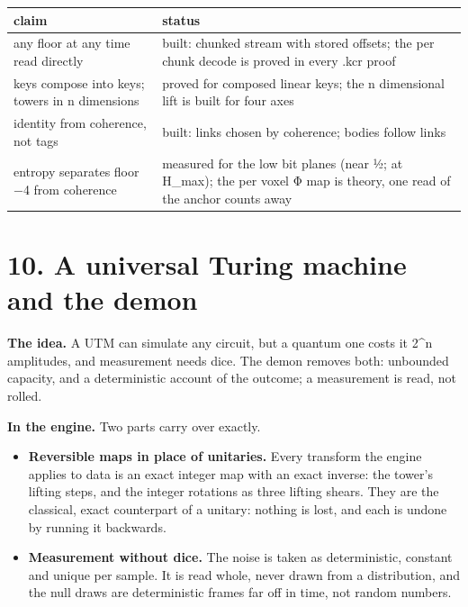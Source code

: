 {\small
\setlength{\tabcolsep}{6pt}
\begin{longtable}{>{\RaggedRight\arraybackslash}p{}>{\RaggedRight\arraybackslash}p{}}
\toprule
claim & status \\
\midrule
\endhead
any floor at any time read directly & built: chunked stream with stored offsets; the per chunk decode is proved in every .kcr proof \\
keys compose into keys; towers in n dimensions & proved for composed linear keys; the n dimensional lift is built for four axes \\
identity from coherence, not tags & built: links chosen by coherence; bodies follow links \\
entropy separates floor −4 from coherence & measured for the low bit planes (near ½; at H\_\allowbreak{}max); the per voxel Φ map is theory, one read of the anchor counts away \\
\bottomrule
\end{longtable}
}

\section{\texorpdfstring{10. A universal Turing machine and the demon}{10. A universal Turing machine and the demon}}

\textbf{The idea.} A UTM can simulate any circuit, but a quantum one costs it 2\textasciicircum{}n amplitudes, and measurement needs dice. The demon removes both: unbounded capacity, and a deterministic account of the outcome; a measurement is read, not rolled.

\textbf{In the engine.} Two parts carry over exactly.

\begin{itemize}
\item \textbf{Reversible maps in place of unitaries.} Every transform the engine applies to data is an exact integer map with an exact inverse: the tower's lifting steps, and the integer rotations as three lifting shears. They are the classical, exact counterpart of a unitary: nothing is lost, and each is undone by running it backwards.
\item \textbf{Measurement without dice.} The noise is taken as deterministic, constant and unique per sample. It is read whole, never drawn from a distribution, and the null draws are deterministic frames far off in time, not random numbers.
\end{itemize}


